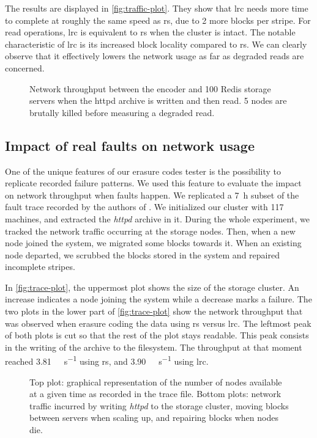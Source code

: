 The results are displayed in \autoref{fig:traffic-plot}.
They show that \ac{lrc} needs more time to complete at roughly the same speed as \ac{rs}, due to 2 more blocks per stripe.
For read operations, \ac{lrc} is equivalent to \ac{rs} when the cluster is intact.
The notable characteristic of \ac{lrc} is its increased block locality compared to \ac{rs}.
We can clearly observe that it effectively lowers the network usage as far as degraded reads are concerned.
\begin{figure*}
    \centering
    
    \caption{Network throughput between the encoder and 100 Redis storage servers when the httpd archive is written and then read. 5 nodes are brutally killed before measuring a degraded read.}
    \label{fig:traffic-plot}
\end{figure*}



\subsection{Impact of real faults on network usage}
\label{subsec:fault-trace}

One of the unique features of our erasure codes tester is the possibility to replicate recorded failure patterns.
We used this feature to evaluate the impact on network throughput when faults happen.
We replicated a \SI{7}{\hour} subset of the fault trace recorded by the authors of \autocite{websites02}.
We initialized our cluster with 117 machines, and extracted the \textit{httpd} archive in it.
During the whole experiment, we tracked the network traffic occurring at the storage nodes.
Then, when a new node joined the system, we migrated some blocks towards it.
When an existing node departed, we scrubbed the blocks stored in the system and repaired incomplete stripes.

In \autoref{fig:trace-plot}, the uppermost plot shows the size of the storage cluster.
An increase indicates a node joining the system while a decrease marks a failure.
The two plots in the lower part of \autoref{fig:trace-plot} show the network throughput that was observed when erasure coding the data using \ac{rs} versus \ac{lrc}.
The leftmost peak of both plots is cut so that the rest of the plot stays 
readable.
This peak consists in the writing of the archive to the filesystem.
The throughput at that moment reached \SI{3.81}{\mega\byte\per\second} using 
\ac{rs}, and \SI{3.90}{\mega\byte\per\second} using \ac{lrc}.

\begin{figure}
    \centering
    
    \caption{Top plot: graphical representation of the number of nodes available at a given time as recorded in the trace file. Bottom plots: network traffic incurred by writing \textit{httpd} to the storage cluster, moving blocks between servers when scaling up, and repairing blocks when nodes die.}
    \label{fig:trace-plot}
\end{figure}